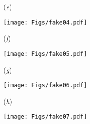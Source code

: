 \begin{figure}[!p]
        
        

        
        \vspace*{0.5 cm}
        \begin{minipage}[c]{.02\linewidth}  \centering (\emph{e})  \end{minipage} \hfill
        \begin{minipage}[c]{.45\linewidth}
                \texttt{[image: Figs/fake04.pdf]}
        \end{minipage} \hfill
        \begin{minipage}[c]{.02\linewidth}  \centering (\emph{f})  \end{minipage} \hfill
        \begin{minipage}[c]{.45\linewidth}
                \texttt{[image: Figs/fake05.pdf]}
        \end{minipage} \hfill   
        
        \vspace*{0.5 cm}
       \begin{minipage}[c]{.02\linewidth}  \centering (\emph{g})  \end{minipage} \hfill
        \begin{minipage}[c]{.45\linewidth}
                \texttt{[image: Figs/fake06.pdf]}
        \end{minipage} \hfill
        \begin{minipage}[c]{.02\linewidth}  \centering (\emph{h})  \end{minipage} \hfill
        \begin{minipage}[c]{.45\linewidth}
                \texttt{[image: Figs/fake07.pdf]}
        \end{minipage} \hfill   

    \end{figure}  
